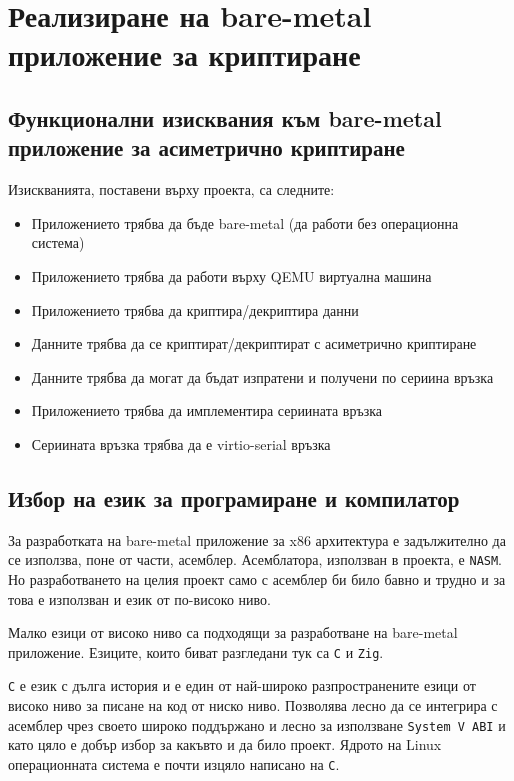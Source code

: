 \chapter{Реализиране на bare-metal приложение за криптиране} %
\section{Функционални изисквания към bare-metal приложение за асиметрично криптиране}
Изискванията, поставени върху проекта, са следните:
\begin{itemize}
  \item Приложението трябва да бъде bare-metal (да работи без операционна система)
  \item Приложението трябва да работи върху QEMU виртуална машина
  \item Приложението трябва да криптира/декриптира данни
  \item Данните трябва да се криптират/декриптират с асиметрично криптиране
  \item Данните трябва да могат да бъдат изпратени и получени по сериина връзка
  \item Приложението трябва да имплементира сериината връзка
  \item Сериината връзка трябва да е virtio-serial връзка
\end{itemize}

\section{Избор на език за програмиране и компилатор}
За разработката на bare-metal приложение за x86 архитектура е задължително да се използва, поне от части, асемблер. Асемблатора, използван в проекта, е {\tt NASM}. Но разработването на целия проект само с асемблер би било бавно и трудно и за това е използван и език от по-високо ниво.

Малко езици от високо ниво са подходящи за разработване на bare-metal приложение. Езиците, които биват разгледани тук са {\tt C} и {\tt Zig}.

{\tt C} е език с дълга история и е един от най-широко разпространените езици от високо ниво за писане на код от ниско ниво. Позволява лесно да се интегрира с асемблер чрез своето широко поддържано и лесно за използване {\tt System V ABI}\cite{sysvabi} и като цяло е добър избор за какъвто и да било проект. Ядрото на Linux операционната система е почти изцяло написано на {\tt C}.\cite{linux-source}

